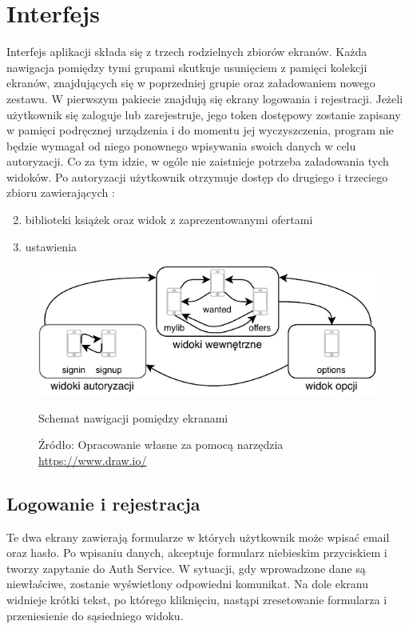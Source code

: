 \chapter{Interfejs}
\label{cha:interfejs}

Interfejs aplikacji składa się z trzech rodzielnych zbiorów ekranów. Każda nawigacja pomiędzy tymi grupami skutkuje usunięciem z pamięci kolekcji ekranów, znajdujących się w poprzedniej grupie oraz załadowaniem nowego zestawu.
W pierwszym pakiecie znajdują się ekrany logowania i rejestracji. Jeżeli użytkownik się zaloguje lub zarejestruje, jego token dostępowy zostanie zapisany w pamięci podręcznej urządzenia i do momentu jej wyczyszczenia, program nie będzie wymagał od niego ponownego wpisywania swoich danych w celu autoryzacji. Co za tym idzie, w ogóle nie zaistnieje potrzeba załadowania tych widoków.
Po autoryzacji użytkownik otrzymuje dostęp do drugiego i trzeciego zbioru zawierających :
\begin{enumerate}
    \setcounter{enumi}{1}
    \item biblioteki książek oraz widok z zaprezentowanymi ofertami
    \item ustawienia
\end{enumerate} 

\begin{figure}[H]
	\centering
	\includegraphics[width=\linewidth]{navig.pdf}
	\caption{\centering Schemat nawigacji pomiędzy ekranami}
	\caption*{\centering Źródło: {Opracowanie własne za pomocą narzędzia \url{https://www.draw.io/}}}
\end{figure}

\section{Logowanie i rejestracja}
Te dwa ekrany zawierają formularze w których użytkownik może wpisać email oraz hasło. Po wpisaniu danych, akceptuje formularz niebieskim przyciskiem i tworzy zapytanie do Auth Service. W sytuacji, gdy wprowadzone dane są niewłaściwe, zostanie wyświetlony odpowiedni komunikat.
Na dole ekranu widnieje krótki tekst, po którego kliknięciu, nastąpi zresetowanie formularza i przeniesienie do sąsiedniego widoku.

